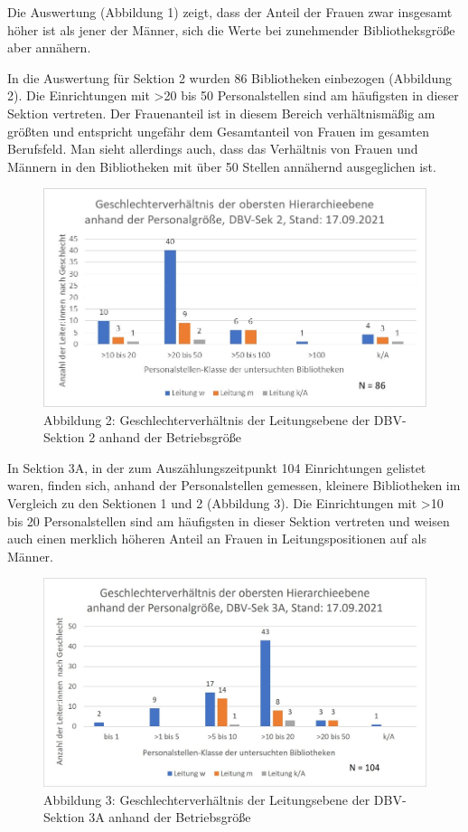 \documentclass[a4paper,
fontsize=11pt,
oneside,
numbers=noperiodatend,
parskip=half-,
bibliography=totoc,
final
]{scrartcl}
\begin{document}
Die Auswertung (Abbildung 1) zeigt, dass der Anteil der Frauen zwar
insgesamt höher ist als jener der Männer, sich die Werte bei zunehmender
Bibliotheksgröße aber annähern.

In die Auswertung für Sektion 2 wurden 86 Bibliotheken einbezogen
(Abbildung 2). Die Einrichtungen mit \textgreater20 bis 50
Personalstellen sind am häufigsten in dieser Sektion vertreten. Der
Frauenanteil ist in diesem Bereich verhältnismäßig am größten und
entspricht ungefähr dem Gesamtanteil von Frauen im gesamten Berufsfeld.
Man sieht allerdings auch, dass das Verhältnis von Frauen und Männern in
den Bibliotheken mit über 50 Stellen annähernd ausgeglichen ist.

\begin{figure}
\centering
\includegraphics{img/Abb.02_DBV-Sek2.jpg}
\caption{Abbildung 2: Geschlechterverhältnis der Leitungsebene der
DBV-Sektion 2 anhand der Betriebsgröße}
\end{figure}

In Sektion 3A, in der zum Auszählungszeitpunkt 104 Einrichtungen
gelistet waren, finden sich, anhand der Personalstellen gemessen,
kleinere Bibliotheken im Vergleich zu den Sektionen 1 und 2 (Abbildung
3). Die Einrichtungen mit \textgreater10 bis 20 Personalstellen sind am
häufigsten in dieser Sektion vertreten und weisen auch einen merklich
höheren Anteil an Frauen in Leitungspositionen auf als Männer.

\begin{figure}
\centering
\includegraphics{img/Abb.03_DBV-Sek3A.jpg}
\caption{Abbildung 3: Geschlechterverhältnis der Leitungsebene der
DBV-Sektion 3A anhand der Betriebsgröße}
\end{figure}
\end{document}
